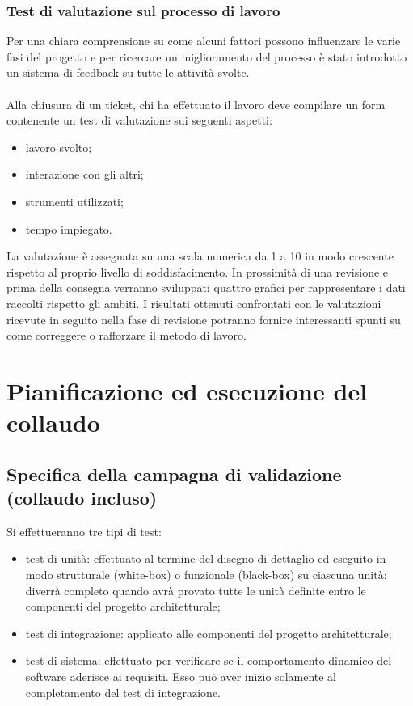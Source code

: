\subsection{Test di valutazione sul processo di lavoro}
Per una chiara comprensione su come alcuni fattori possono influenzare le varie
fasi del progetto e per ricercare un miglioramento del processo \`e
stato introdotto un sistema di feedback su tutte le attivit\`a svolte.\\ \\
Alla chiusura di un ticket, chi ha effettuato il lavoro deve compilare un form
contenente un test di valutazione sui seguenti aspetti:

\begin{itemize}
\item lavoro svolto;
\item interazione con gli altri;
\item strumenti utilizzati;
\item tempo impiegato.
\end{itemize}

La valutazione \`e assegnata su una scala numerica da 1 a 10 in modo crescente
rispetto al proprio livello di soddisfacimento.
In prossimit\`a di una revisione e prima della consegna verranno sviluppati
quattro grafici per rappresentare i dati raccolti rispetto gli ambiti. 
I risultati ottenuti confrontati con le valutazioni ricevute in seguito nella
fase di revisione potranno fornire interessanti spunti su come correggere o
rafforzare il metodo di lavoro.





\chapter{Pianificazione ed esecuzione del \\collaudo}
\thispagestyle{fancy} %

\section{Specifica della campagna di validazione \\(collaudo incluso)}
Si effettueranno tre tipi di test:

\begin{itemize}
	\item test di unit\`a: effettuato al termine del disegno di dettaglio ed eseguito
in modo strutturale (white-box) o funzionale (black-box) su ciascuna unit\`a; diverr\`a completo quando avr\`a provato tutte le unit\`a definite entro le
componenti del progetto architetturale;
	\item test di integrazione: applicato alle componenti del progetto
architetturale;
	\item test di sistema: effettuato per verificare se il comportamento dinamico
del software aderisce ai requisiti. Esso pu\`o aver inizio solamente al
completamento del test di integrazione.
\end{itemize}

